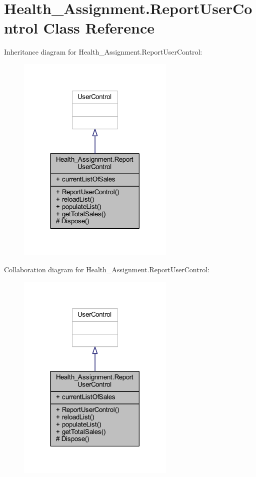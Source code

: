 \hypertarget{class_health___assignment_1_1_report_user_control}{}\section{Health\+\_\+\+Assignment.\+Report\+User\+Control Class Reference}
\label{class_health___assignment_1_1_report_user_control}


Inheritance diagram for Health\+\_\+\+Assignment.\+Report\+User\+Control\+:\nopagebreak
\begin{figure}[H]
\begin{center}
\leavevmode
\includegraphics[width=213pt]{class_health___assignment_1_1_report_user_control__inherit__graph}
\end{center}
\end{figure}


Collaboration diagram for Health\+\_\+\+Assignment.\+Report\+User\+Control\+:\nopagebreak
\begin{figure}[H]
\begin{center}
\leavevmode
\includegraphics[width=213pt]{class_health___assignment_1_1_report_user_control__coll__graph}
\end{center}
\end{figure}

